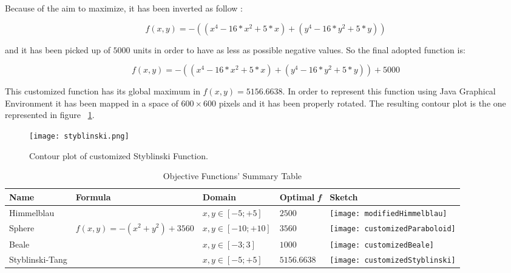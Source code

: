 Because of the aim to maximize, it has been inverted as follow :

\begin{equation}
f(x, y) = -((x^4 - 16 * x^2 + 5 * x) + (y^4 - 16 * y^2 + 5 * y))
\end{equation}

and it has been picked up of $5000$ units in order to have as less as possible negative values. So the final adopted function is: 

\begin{equation}
f(x, y) = -((x^4 - 16 * x^2 + 5 * x) + (y^4 - 16 * y^2 + 5 * y)) + 5000
\end{equation}

This customized function has its global maximum in $f(x, y) = 5156.6638$. In order to represent this function using Java Graphical Environment it has been mapped in a space of $600 \times 600$ pixels and it has been properly rotated. The resulting contour plot is the one represented in figure ~\ref{fig:ContourStyblinskiFunction}.

\begin{figure}[h!]
	\centering
	\texttt{[image: styblinski.png]}
	\caption{Contour plot of customized Styblinski Function.}
	\label{fig:ContourStyblinskiFunction}
\end{figure}

\begin{table} 
	\centering
	\caption{Objective Functions'  Summary Table}
	\begin{tabular}
		{l l l l l} \hline Name & Formula & Domain & Optimal \textit{f} & Sketch \\
		\hline Himmelblau & \vtop{\hbox{\strut $f(x, y) = - ((x^2 + y -11)^2+$}\hbox{\strut $+(x + y^2 - 7)^2) + 2500$}} & $x, y \in [-5;+5]$ & $2500$ & \parbox[c]{1em}{
			\texttt{[image: modifiedHimmelblau]}} \\
		Sphere & $f(x, y) = -(x^2 + y^2) + 3560$ &$x, y \in [-10;+10]$ & $3560$ & \parbox[c]{1em}{
			\texttt{[image: customizedParaboloid]}} \\
		Beale &  &$x, y \in [-3;3]$ & $1000$ & \parbox[c]{1em}{
			\texttt{[image: customizedBeale]}} \\
		Styblinski-Tang &  &$x, y \in [-5;+5]$ & $5156.6638$ & \parbox[c]{1em}{
			\texttt{[image: customizedStyblinski]}} \\
		\hline
	\end{tabular}
\end{table}

